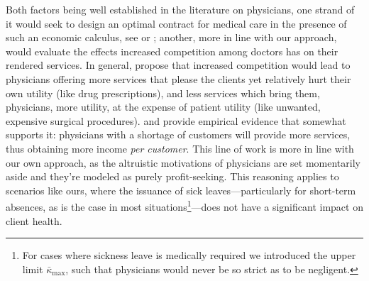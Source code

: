 \documentclass[../main.tex]{subfiles}
\begin{document}
Both factors being well established in the literature on physicians, one strand of it would seek to design an optimal contract for medical care in the presence of such an economic calculus, see \cite{chone-ma} or \cite{optimal-altruism}; another, more in line with our approach, would evaluate the effects increased competition among doctors has on their rendered services. In general, \cite{currie2023effects} propose that increased competition would lead to physicians offering more services that please the clients yet relatively hurt their own utility (like drug prescriptions), and less services which bring them, physicians, more utility, at the expense of patient utility (like unwanted, expensive surgical procedures). \cite{iversen-luras} and \cite{iversen2004} provide empirical evidence that somewhat supports it: physicians with a shortage of customers will provide more services, thus obtaining more income \textit{per customer}. This line of work is more in line with our own approach, as the altruistic motivations of physicians are set momentarily aside and they're modeled as purely profit-seeking. This reasoning applies to scenarios like ours, where the issuance of sick leaves—particularly for short-term absences, as is the case in most situations\footnote{For cases where sickness leave is medically required we introduced the upper limit $\bar{\kappa}_{\max}$, such that physicians would never be so strict as to be negligent.}—does not have a significant impact on client health.
\end{document}

